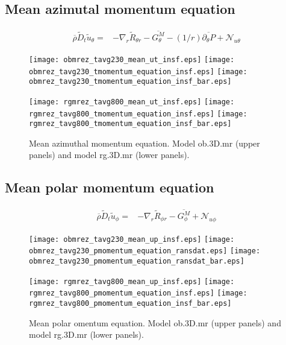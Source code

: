 \documentclass[10pt,paper=a4]{report}
\newcommand{\fav}{\widetilde}
\newcommand{\av}{\overline}
\begin{document}
\newpage

\subsection{Mean azimutal momentum equation}

\begin{align}
\av{\rho}\fav{D}_t\fav{u}_\theta = &  -\nabla_r \fav{R}_{\theta r} -\av{G^{M}_\theta} - (1/r)\av{\partial_\theta P} + {\mathcal N_{u \theta}}
\end{align}

\begin{figure}[!h]
\centerline{
\texttt{[image: obmrez\_tavg230\_mean\_ut\_insf.eps]}
\texttt{[image: obmrez\_tavg230\_tmomentum\_equation\_insf.eps]}
\texttt{[image: obmrez\_tavg230\_tmomentum\_equation\_insf\_bar.eps]}}

\centerline{
\texttt{[image: rgmrez\_tavg800\_mean\_ut\_insf.eps]}
\texttt{[image: rgmrez\_tavg800\_tmomentum\_equation\_insf.eps]}
\texttt{[image: rgmrez\_tavg800\_tmomentum\_equation\_insf\_bar.eps]}}
\caption{Mean azimuthal momentum equation. Model {\sf ob.3D.mr} (upper panels) and model {\sf rg.3D.mr} (lower panels). \label{fig:tm-equation}}
\end{figure}

\newpage

\subsection{Mean polar momentum equation}

\begin{align}
\av{\rho}\fav{D}_t\fav{u}_\phi = & -\nabla_r \fav{R}_{\phi r} -\av{G^{M}_\phi} + {\mathcal N_{u \phi}}
\end{align}

\begin{figure}[!h]
\centerline{
\texttt{[image: obmrez\_tavg230\_mean\_up\_insf.eps]}
\texttt{[image: obmrez\_tavg230\_pmomentum\_equation\_ransdat.eps]}
\texttt{[image: obmrez\_tavg230\_pmomentum\_equation\_ransdat\_bar.eps]}}

\centerline{
\texttt{[image: rgmrez\_tavg800\_mean\_up\_insf.eps]}
\texttt{[image: rgmrez\_tavg800\_pmomentum\_equation\_insf.eps]}
\texttt{[image: rgmrez\_tavg800\_pmomentum\_equation\_insf\_bar.eps]}}
\caption{Mean polar omentum equation. Model {\sf ob.3D.mr} (upper panels) and model {\sf rg.3D.mr} (lower panels). \label{fig:pm-equation}}
\end{figure}
\end{document}
